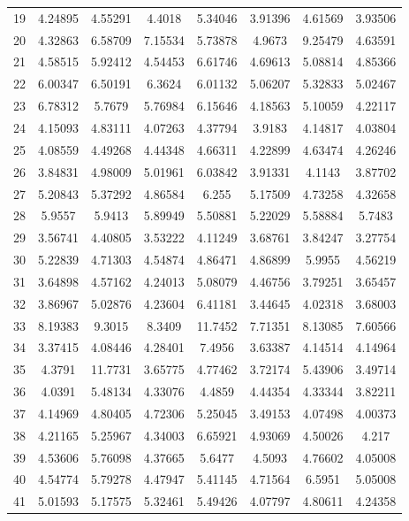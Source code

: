 \begin{center}
\begin{longtable}{cccccccc}
19 & 4.24895 & 4.55291 & 4.4018 & 5.34046 & 3.91396 & 4.61569 & 3.93506\\
20 & 4.32863 & 6.58709 & 7.15534 & 5.73878 & 4.9673 & 9.25479 & 4.63591\\
21 & 4.58515 & 5.92412 & 4.54453 & 6.61746 & 4.69613 & 5.08814 & 4.85366\\
22 & 6.00347 & 6.50191 & 6.3624 & 6.01132 & 5.06207 & 5.32833 & 5.02467\\
23 & 6.78312 & 5.7679 & 5.76984 & 6.15646 & 4.18563 & 5.10059 & 4.22117\\
24 & 4.15093 & 4.83111 & 4.07263 & 4.37794 & 3.9183 & 4.14817 & 4.03804\\
25 & 4.08559 & 4.49268 & 4.44348 & 4.66311 & 4.22899 & 4.63474 & 4.26246\\
26 & 3.84831 & 4.98009 & 5.01961 & 6.03842 & 3.91331 & 4.1143 & 3.87702\\
27 & 5.20843 & 5.37292 & 4.86584 & 6.255 & 5.17509 & 4.73258 & 4.32658\\
28 & 5.9557 & 5.9413 & 5.89949 & 5.50881 & 5.22029 & 5.58884 & 5.7483\\
29 & 3.56741 & 4.40805 & 3.53222 & 4.11249 & 3.68761 & 3.84247 & 3.27754\\
30 & 5.22839 & 4.71303 & 4.54874 & 4.86471 & 4.86899 & 5.9955 & 4.56219\\
31 & 3.64898 & 4.57162 & 4.24013 & 5.08079 & 4.46756 & 3.79251 & 3.65457\\
32 & 3.86967 & 5.02876 & 4.23604 & 6.41181 & 3.44645 & 4.02318 & 3.68003\\
33 & 8.19383 & 9.3015 & 8.3409 & 11.7452 & 7.71351 & 8.13085 & 7.60566\\
34 & 3.37415 & 4.08446 & 4.28401 & 7.4956 & 3.63387 & 4.14514 & 4.14964\\
35 & 4.3791 & 11.7731 & 3.65775 & 4.77462 & 3.72174 & 5.43906 & 3.49714\\
36 & 4.0391 & 5.48134 & 4.33076 & 4.4859 & 4.44354 & 4.33344 & 3.82211\\
37 & 4.14969 & 4.80405 & 4.72306 & 5.25045 & 3.49153 & 4.07498 & 4.00373\\
38 & 4.21165 & 5.25967 & 4.34003 & 6.65921 & 4.93069 & 4.50026 & 4.217\\
39 & 4.53606 & 5.76098 & 4.37665 & 5.6477 & 4.5093 & 4.76602 & 4.05008\\
40 & 4.54774 & 5.79278 & 4.47947 & 5.41145 & 4.71564 & 6.5951 & 5.05008\\
41 & 5.01593 & 5.17575 & 5.32461 & 5.49426 & 4.07797 & 4.80611 & 4.24358\\

\end{longtable}
\end{center}

